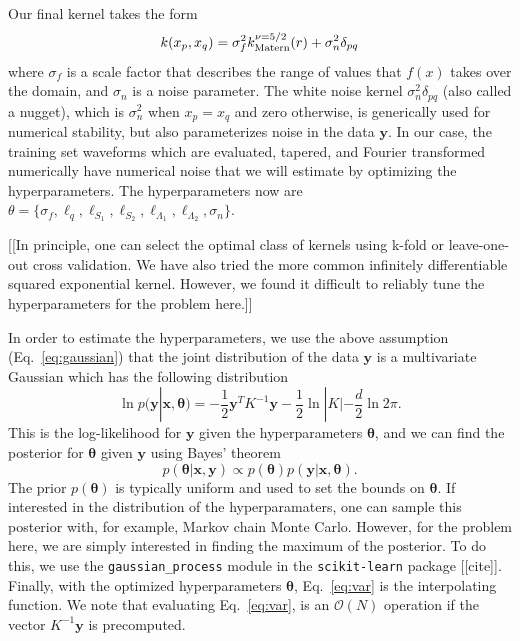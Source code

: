 \documentclass[prd,aps,letter,twocolumn,floatfix,notitlepage,nofootinbib]{revtex4-1}
\begin{document}
Our final kernel takes the form
\begin{equation}
k(x_p, x_q) = \sigma_f^2 k_{\rm Matern}^{\nu=5/2}(r) + \sigma_n^2 \delta_{pq}
\end{equation}
where $\sigma_f$ is a scale factor that describes the range of values that $f(x)$ takes over the domain, 
and $\sigma_n$ is a noise parameter. The white noise kernel $\sigma_n^2 \delta_{pq}$ (also called a nugget), which is
$\sigma_n^2$ when $x_p=x_q$ and zero otherwise, is generically used for numerical stability, but also parameterizes
noise in the data ${\bm y}$. In our case, the training set waveforms which are evaluated, tapered, and 
Fourier transformed numerically have numerical noise that we will estimate by optimizing the hyperparameters.
The hyperparameters now are $\theta = \{\sigma_f, \ell_q, \ell_{S_1}, \ell_{S_2}, \ell_{\Lambda_1}, \ell_{\Lambda_2}, \sigma_n\}$.

[[In principle, one can select the optimal class of kernels using k-fold or leave-one-out cross validation. We have also tried the 
more common infinitely differentiable squared exponential kernel. However, we found it difficult to reliably tune the 
hyperparameters for the problem here.]]

In order to estimate the hyperparameters, we use the above assumption (Eq.~\eqref{eq:gaussian}) that the joint distribution of 
the data ${\bm y}$ is a multivariate Gaussian which has the following distribution
\begin{equation}
\ln p({\bm y} | {\bm x}, {\bm \theta}) = -\frac{1}{2}{\bm y}^T K^{-1} {\bm y} - \frac{1}{2} \ln |K| - \frac{d}{2} \ln 2\pi.
\end{equation}
This is the log-likelihood for ${\bm y}$ given the hyperparameters ${\bm \theta}$, and we can find the posterior for ${\bm \theta}$
given ${\bm y}$ using Bayes' theorem
\begin{equation}
p({\bm \theta} | {\bm x}, {\bm y}) \propto p({\bm \theta}) p({\bm y} | {\bm x}, {\bm \theta}).
\end{equation}
The prior $p({\bm \theta})$ is typically uniform and used to set the bounds on ${\bm \theta}$. If interested in the distribution of the 
hyperparamaters, one can sample this posterior with, for example, Markov chain Monte Carlo. However, for the problem here, we are
simply interested in finding the maximum of the posterior. To do this, we use the \texttt{gaussian\_process} module in the
\texttt{scikit-learn} package [[cite]]. Finally, with the optimized hyperparameters ${\bm \theta}$, Eq.~\eqref{eq:var} is the 
interpolating function. We note that evaluating Eq.~\eqref{eq:var}, is an $\mathcal{O}(N)$ operation if the vector $K^{-1}{\bm y}$ is
precomputed.
\end{document}
